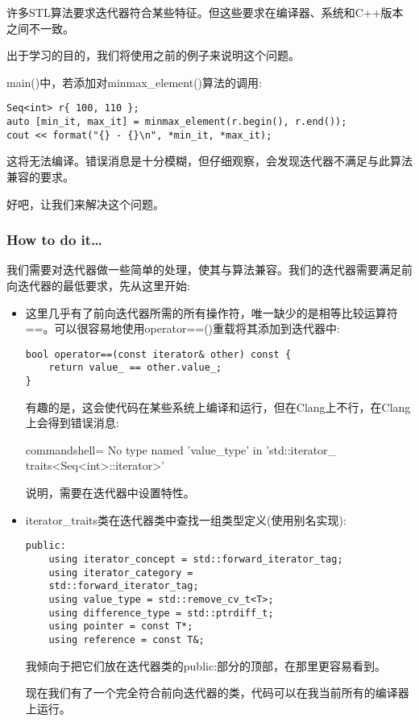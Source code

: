 
许多STL算法要求迭代器符合某些特征。但这些要求在编译器、系统和C++版本之间不一致。

出于学习的目的，我们将使用之前的例子来说明这个问题。

main()中，若添加对minmax\_element()算法的调用:

\begin{lstlisting}[style=styleCXX]
Seq<int> r{ 100, 110 };
auto [min_it, max_it] = minmax_element(r.begin(), r.end());
cout << format("{} - {}\n", *min_it, *max_it);
\end{lstlisting}

这将无法编译。错误消息是十分模糊，但仔细观察，会发现迭代器不满足与此算法兼容的要求。

好吧，让我们来解决这个问题。

\subsubsection{How to do it…}

我们需要对迭代器做一些简单的处理，使其与算法兼容。我们的迭代器需要满足前向迭代器的最低要求，先从这里开始:

\begin{itemize}
\item 
这里几乎有了前向迭代器所需的所有操作符，唯一缺少的是相等比较运算符==。可以很容易地使用operator==()重载将其添加到迭代器中:

\begin{lstlisting}[style=styleCXX]
bool operator==(const iterator& other) const {
	return value_ == other.value_;
}
\end{lstlisting}

有趣的是，这会使代码在某些系统上编译和运行，但在Clang上不行，在Clang上会得到错误消息:

\begin{tcblisting}{commandshell={}}
No type named 'value_type' in 'std::iterator_
traits<Seq<int>::iterator>'
\end{tcblisting}

说明，需要在迭代器中设置特性。

\item 
iterator\_traits类在迭代器类中查找一组类型定义(使用别名实现):

\begin{lstlisting}[style=styleCXX]
public:
	using iterator_concept = std::forward_iterator_tag;
	using iterator_category =
	std::forward_iterator_tag;
	using value_type = std::remove_cv_t<T>;
	using difference_type = std::ptrdiff_t;
	using pointer = const T*;
	using reference = const T&;
\end{lstlisting}

我倾向于把它们放在迭代器类的public:部分的顶部，在那里更容易看到。

现在我们有了一个完全符合前向迭代器的类，代码可以在我当前所有的编译器上运行。

\end{itemize}

